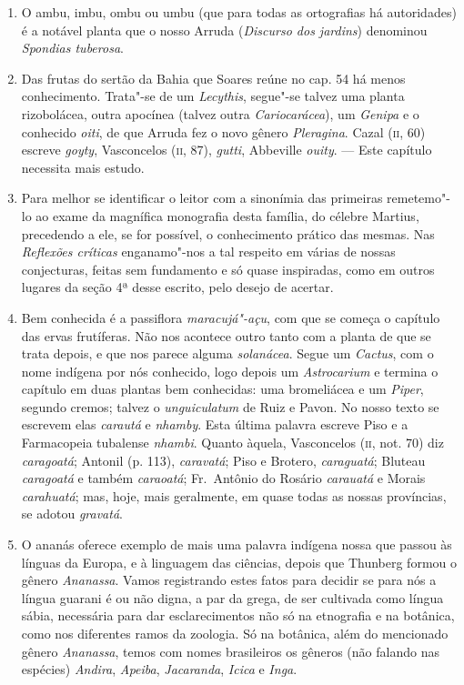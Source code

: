 \begin{enumerate}
\item O ambu, imbu, ombu ou umbu (que para todas as ortografias há autoridades) é a 
notável planta que o nosso Arruda (\textit{Discurso dos jardins}) denominou \textit{Spondias tuberosa}.

\item Das frutas do sertão da Bahia que Soares reúne no cap. 54 há menos 
conhecimento. Trata"-se de um \textit{Lecythis}, segue"-se talvez uma planta rizobolácea, outra 
apocínea (talvez outra \textit{Cariocarácea}), um \textit{Genipa} e o conhecido \textit{oiti}, de que Arruda fez o 
novo gênero \textit{Pleragina}. Cazal (\textsc{ii}, 60) escreve \textit{goyty}, Vasconcelos (\textsc{ii}, 87), \textit{gutti}, 
Abbeville \textit{ouity}. --- Este capítulo necessita mais estudo.

\item Para melhor se identificar o leitor com a sinonímia das primeiras remetemo"-lo ao 
exame da magnífica monografia desta família, do célebre Martius, precedendo a ele, se 
for possível, o conhecimento prático das mesmas.
Nas \textit{Reflexões críticas} enganamo"-nos a tal respeito em várias de nossas conjecturas, 
feitas sem fundamento e só quase inspiradas, como em outros lugares da seção 4ª desse 
escrito, pelo desejo de acertar.

\item  Bem conhecida é a passiflora \textit{maracujá"-açu}, com que se começa o
capítulo das ervas frutíferas. Não nos acontece outro tanto com a planta
de que se trata depois, e que nos parece alguma \textit{solanácea}. Segue um \textit{Cactus}, 
com o nome indígena por nós conhecido, logo depois um \textit{Astrocarium}
e termina o capítulo em duas plantas bem conhecidas: uma bromeliácea e
um \textit{Piper}, segundo cremos; talvez o \textit{unguiculatum} de Ruiz e Pavon. No nosso
texto se escrevem elas \textit{carautá} e \textit{nhamby}. Esta última palavra escreve Piso
e a Farmacopeia tubalense \textit{nhambi}. Quanto àquela, Vasconcelos (\textsc{ii}, not.
70) diz \textit{caragoatá}; Antonil (p. 113), \textit{caravatá}; Piso e Brotero, \textit{caraguatá};
Bluteau \textit{caragoatá} e também \textit{caraoatá}; Fr.~Antônio do Rosário \textit{carauatá} e
Morais \textit{carahuatá}; mas, hoje, mais geralmente, em quase todas as nossas
províncias, se adotou \textit{gravatá}.

\item O ananás oferece exemplo de mais uma palavra indígena nossa que passou às 
línguas da Europa, e à linguagem das ciências, depois que Thunberg formou o gênero  
\textit{Ananassa}. Vamos registrando estes fatos para decidir se para nós a língua guarani é ou 
não digna, a par da grega, de ser cultivada como língua sábia, necessária para dar 
esclarecimentos não só na etnografia e na botânica, como nos diferentes ramos da 
zoologia. Só na botânica, além do mencionado gênero \textit{Ananassa}, temos com nomes 
brasileiros os gêneros (não falando nas espécies) \textit{Andira}, \textit{Apeiba}, \textit{Jacaranda}, \textit{Icica} e \textit{Inga}.


\end{enumerate}
